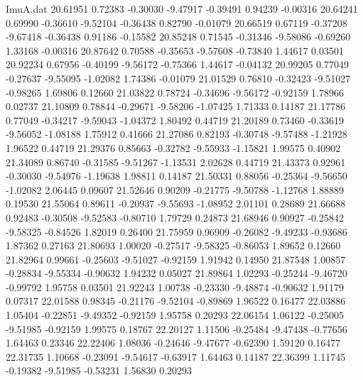 \begin{filecontents}{ImuA.dat}
  20.61951    0.72383   -0.30030   -9.47917   -0.39491    0.94239   -0.00316
  20.64241    0.69990   -0.36610   -9.52104   -0.36438    0.82790   -0.01079
  20.66519    0.67119   -0.37208   -9.67418   -0.36438    0.91186   -0.15582
  20.85248    0.71545   -0.31346   -9.58086   -0.69260    1.33168   -0.00316
  20.87642    0.70588   -0.35653   -9.57608   -0.73840    1.44617    0.03501
  20.92234    0.67956   -0.40199   -9.56172   -0.75366    1.44617   -0.04132
  20.99205    0.77049   -0.27637   -9.55095   -1.02082    1.74386   -0.01079
  21.01529    0.76810   -0.32423   -9.51027   -0.98265    1.69806    0.12660
  21.03822    0.78724   -0.34696   -9.56172   -0.92159    1.78966    0.02737
  21.10809    0.78844   -0.29671   -9.58206   -1.07425    1.71333    0.14187
  21.17786    0.77049   -0.34217   -9.59043   -1.04372    1.80492    0.44719
  21.20189    0.73460   -0.33619   -9.56052   -1.08188    1.75912    0.41666
  21.27086    0.82193   -0.30748   -9.57488   -1.21928    1.96522    0.44719
  21.29376    0.85663   -0.32782   -9.55933   -1.15821    1.99575    0.40902
  21.34089    0.86740   -0.31585   -9.51267   -1.13531    2.02628    0.44719
  21.43373    0.92961   -0.30030   -9.54976   -1.19638    1.98811    0.14187
  21.50331    0.88056   -0.25364   -9.56650   -1.02082    2.06445    0.09607
  21.52646    0.90209   -0.21775   -9.50788   -1.12768    1.88889    0.19530
  21.55064    0.89611   -0.20937   -9.55693   -1.08952    2.01101    0.28689
  21.66688    0.92483   -0.30508   -9.52583   -0.80710    1.79729    0.24873
  21.68946    0.90927   -0.25842   -9.58325   -0.84526    1.82019    0.26400
  21.75959    0.96909   -0.26082   -9.49233   -0.93686    1.87362    0.27163
  21.80693    1.00020   -0.27517   -9.58325   -0.86053    1.89652    0.12660
  21.82964    0.99661   -0.25603   -9.51027   -0.92159    1.91942    0.14950
  21.87548    1.00857   -0.28834   -9.55334   -0.90632    1.94232    0.05027
  21.89864    1.02293   -0.25244   -9.46720   -0.99792    1.95758    0.03501
  21.92243    1.00738   -0.23330   -9.48874   -0.90632    1.91179    0.07317
  22.01588    0.98345   -0.21176   -9.52104   -0.89869    1.96522    0.16477
  22.03886    1.05404   -0.22851   -9.49352   -0.92159    1.95758    0.20293
  22.06154    1.06122   -0.25005   -9.51985   -0.92159    1.99575    0.18767
  22.20127    1.11506   -0.25484   -9.47438   -0.77656    1.64463    0.23346
  22.22406    1.08036   -0.24646   -9.47677   -0.62390    1.59120    0.16477
  22.31735    1.10668   -0.23091   -9.54617   -0.63917    1.64463    0.14187
  22.36399    1.11745   -0.19382   -9.51985   -0.53231    1.56830    0.20293

\end{filecontents}
